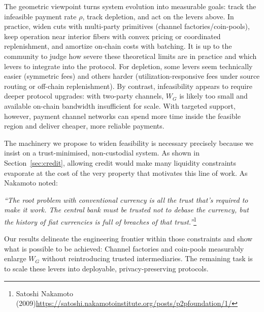 \documentclass[10pt,twocolumn]{article}
\begin{document}
The geometric viewpoint turns system evolution into measurable goals: track the infeasible payment rate $\rho$, track depletion, and act on the levers above. In practice, widen cuts with multi-party primitives (channel factories/coin-pools), keep operation near interior fibers with convex pricing or coordinated replenishment, and amortize on-chain costs with batching. It is up to the community to judge how severe these theoretical limits are in practice and which levers to integrate into the protocol. For depletion, some levers seem technically easier (symmetric fees) and others harder (utilization-responsive fees under source routing or off-chain replenishment). By contrast, infeasibility appears to require deeper protocol upgrades: with two-party channels, $W_G$ is likely too small and available on-chain bandwidth insufficient for scale. With targeted support, however, payment channel networks can spend more time inside the feasible region and deliver cheaper, more reliable payments.

The machinery we propose to widen feasibility is necessary precisely because we insist on a trust-minimised, non-custodial system. As shown in Section~\ref{sec:credit}, allowing credit would make many liquidity constraints evaporate at the cost of the very property that motivates this line of work. As Nakamoto noted:
\begin{displayquote}
\emph{“The root problem with conventional currency is all the trust that’s required to make it work. The central bank must be trusted not to debase the currency, but the history of fiat currencies is full of breaches of that trust.”}\footnote{Satoshi Nakamoto (2009)\url{https://satoshi.nakamotoinstitute.org/posts/p2pfoundation/1/}} 
\end{displayquote}
Our results delineate the engineering frontier within those constraints and show what is possible to be achieved: Channel factories and coin-pools measurably enlarge $W_G$ without reintroducing trusted intermediaries. The remaining task is to scale these levers into deployable, privacy-preserving protocols.





\end{document}
